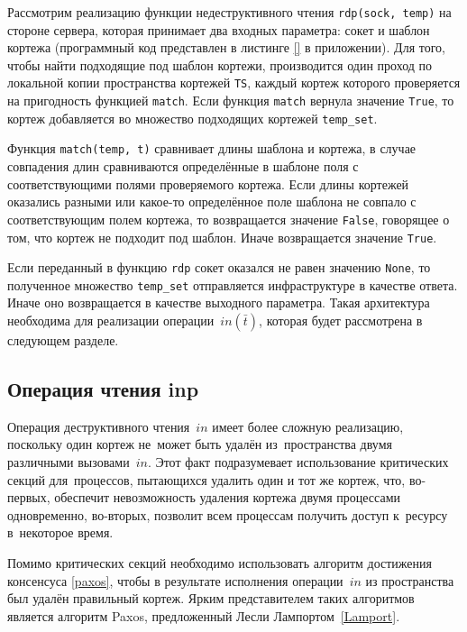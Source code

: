 Рассмотрим реализацию функции недеструктивного чтения \texttt{rdp(sock, temp)} на стороне сервера, которая принимает два входных параметра: сокет и шаблон кортежа (программный код представлен в листинге \ref{} в приложении). Для того, чтобы найти подходящие под шаблон кортежи, производится один проход по локальной копии пространства кортежей \texttt{TS}, каждый кортеж которого проверяется на пригодность функцией \texttt{match}. Если функция \texttt{match} вернула значение \texttt{True}, то кортеж добавляется во множество подходящих кортежей \texttt{temp_set}.

Функция \texttt{match(temp, t)} сравнивает длины шаблона и кортежа, в случае совпадения длин сравниваются определённые в шаблоне поля с соответствующими полями проверяемого кортежа. Если длины кортежей оказались разными или какое-то определённое поле шаблона не совпало с соответствующим полем кортежа, то возвращается значение \texttt{False}, говорящее о том, что кортеж не подходит под шаблон. Иначе возвращается значение \texttt{True}.

Если переданный в функцию \texttt{rdp} сокет оказался не равен значению \texttt{None}, то полученное множество \texttt{temp_set} отправляется инфраструктуре в качестве ответа. Иначе оно возвращается в качестве выходного параметра. Такая архитектура необходима для реализации операции~$in(\bar t)$, которая будет рассмотрена в следующем разделе.


\subsection{Операция чтения inp}\label{subsec:8}
Операция деструктивного чтения~$in$ имеет более сложную реализацию, поскольку один кортеж не~может быть удалён из~пространства двумя различными вызовами~$in$. Этот факт подразумевает использование критических секций для~процессов, пытающихся удалить один и тот же кортеж, что, во-первых, обеспечит невозможность удаления кортежа двумя процессами одновременно, во-вторых, позволит всем процессам получить доступ к~ресурсу в~некоторое время.

Помимо критических секций необходимо использовать алгоритм достижения консенсуса \ref{paxos}, чтобы в результате исполнения операции~$in$ из пространства был удалён правильный кортеж. Ярким представителем таких алгоритмов является алгоритм Paxos, предложенный Лесли Лампортом~\ref{Lamport}.

